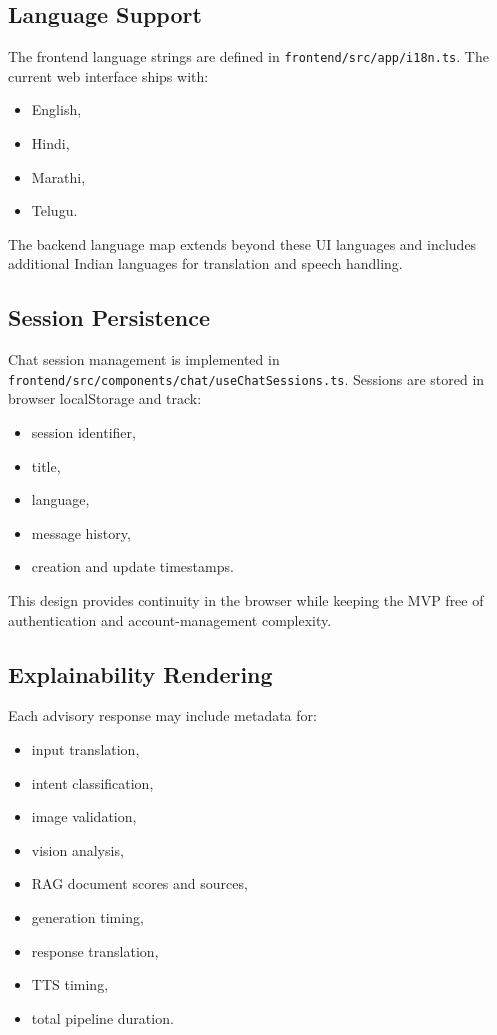 \documentclass[11pt,a4paper]{article}
\begin{document}
\subsection{Language Support}

The frontend language strings are defined in \texttt{frontend/src/app/i18n.ts}. The current web interface ships with:

\begin{itemize}
  \item English,
  \item Hindi,
  \item Marathi,
  \item Telugu.
\end{itemize}

The backend language map extends beyond these UI languages and includes additional Indian languages for translation and speech handling.

\subsection{Session Persistence}

Chat session management is implemented in \texttt{frontend/src/components/chat/useChatSessions.ts}. Sessions are stored in browser localStorage and track:

\begin{itemize}
  \item session identifier,
  \item title,
  \item language,
  \item message history,
  \item creation and update timestamps.
\end{itemize}

This design provides continuity in the browser while keeping the MVP free of authentication and account-management complexity.

\subsection{Explainability Rendering}

Each advisory response may include metadata for:

\begin{itemize}
  \item input translation,
  \item intent classification,
  \item image validation,
  \item vision analysis,
  \item RAG document scores and sources,
  \item generation timing,
  \item response translation,
  \item TTS timing,
  \item total pipeline duration.
\end{itemize}
\end{document}
